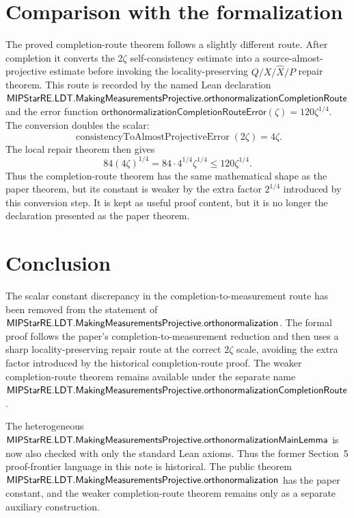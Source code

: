 \documentclass{article}
\begin{document}
\section{Comparison with the formalization}

The proved completion-route theorem follows a slightly different route.  After
completion it converts the \(2\zeta\) self-consistency estimate into a
source-almost-projective estimate before invoking the locality-preserving
\(Q/X/\widehat X/P\) repair theorem.  This route is recorded by the named
Lean declaration
\(\textsf{MIPStarRE.LDT.MakingMeasurementsProjective.orthonormalizationCompletionRoute}\)
and the error function
\(\mathsf{orthonormalizationCompletionRouteError}(\zeta)=120\zeta^{1/4}\).
The conversion doubles the scalar:
\[
  \operatorname{consistencyToAlmostProjectiveError}(2\zeta)=4\zeta.
\]
The local repair theorem then gives
\[
  84(4\zeta)^{1/4}
    = 84\cdot 4^{1/4}\zeta^{1/4}
    \le 120\zeta^{1/4}.
\]
Thus the completion-route theorem has the same mathematical shape as the paper
theorem, but its constant is weaker by the extra factor \(2^{1/4}\) introduced
by this conversion step.  It is kept as useful proof content, but it is no
longer the declaration presented as the paper theorem.

\section{Conclusion}

The scalar constant discrepancy in the completion-to-measurement route has been
removed from the statement of
\(\textsf{MIPStarRE.LDT.MakingMeasurementsProjective.orthonormalization}\).
The formal proof follows the paper's completion-to-measurement reduction and
then uses a sharp locality-preserving repair route at the correct \(2\zeta\)
scale, avoiding the extra factor introduced by the historical completion-route
proof.  The weaker completion-route theorem remains available under the
separate name
\(\textsf{MIPStarRE.LDT.MakingMeasurementsProjective.orthonormalizationCompletionRoute}\).

The heterogeneous
\(\textsf{MIPStarRE.LDT.MakingMeasurementsProjective.orthonormalizationMainLemma}\)
is now also checked with only the standard Lean axioms.  Thus the former
Section~5 proof-frontier language in this note is historical.  The public
theorem
\(\textsf{MIPStarRE.LDT.MakingMeasurementsProjective.orthonormalization}\)
has the paper constant, and the weaker completion-route theorem remains only as
a separate auxiliary construction.



\end{document}
